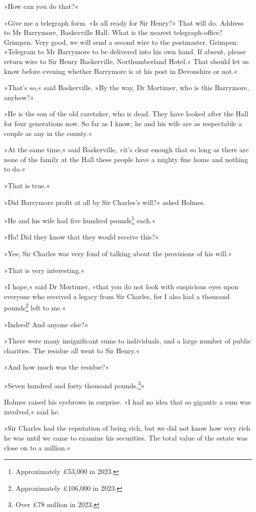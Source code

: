 »How can you do that?«

»Give me a telegraph form. »Is all ready for Sir Henry?« That will do. Address to Mr Barrymore, Baskerville Hall. What is the nearest telegraph-office? Grimpen. Very good, we will send a second wire to the postmaster, Grimpen: »Telegram to Mr Barrymore to be delivered into his own hand. If absent, please return wire to Sir Henry Baskerville, Northumberland Hotel.« That should let us know before evening whether Barrymore is at his post in Devonshire or not.«

»That's so,« said Baskerville. »By the way, Dr Mortimer, who is this Barrymore, anyhow?«

»He is the son of the old caretaker, who is dead. They have looked after the Hall for four generations now. So far as I know, he and his wife are as respectable a couple as any in the county.«

»At the same time,« said Baskerville, »it's clear enough that so long as there are none of the family at the Hall these people have a mighty fine home and nothing to do.«

»That is true.«

»Did Barrymore profit at all by Sir Charles's will?« asked Holmes.

»He and his wife had five hundred pounds\footnote{Approximately \pounds 53,000 in 2023.} each.«

»Ha! Did they know that they would receive this?«

»Yes; Sir Charles was very fond of talking about the provisions of his will.«

»That is very interesting.«

»I hope,« said Dr Mortimer, »that you do not look with suspicious eyes upon everyone who received a legacy from Sir Charles, for I also had a thousand pounds\footnote{Approximately \pounds 106,000 in 2023.} left to me.«

»Indeed! And anyone else?«

»There were many insignificant sums to individuals, and a large number of public charities. The residue all went to Sir Henry.«

»And how much was the residue?«

»Seven hundred and forty thousand pounds.\footnote{Over \pounds 78 million in 2023.}«

Holmes raised his eyebrows in surprise. »I had no idea that so gigantic a sum was involved,« said he.

»Sir Charles had the reputation of being rich, but we did not know how very rich he was until we came to examine his securities. The total value of the estate was close on to a million.«

